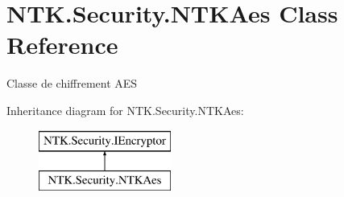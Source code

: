 \hypertarget{class_n_t_k_1_1_security_1_1_n_t_k_aes}{}\section{N\+T\+K.\+Security.\+N\+T\+K\+Aes Class Reference}
\label{class_n_t_k_1_1_security_1_1_n_t_k_aes}


Classe de chiffrement A\+ES  


Inheritance diagram for N\+T\+K.\+Security.\+N\+T\+K\+Aes\+:\begin{figure}[H]
\begin{center}
\leavevmode
\includegraphics[height=2.000000cm]{de/dc9/class_n_t_k_1_1_security_1_1_n_t_k_aes}
\end{center}
\end{figure}
